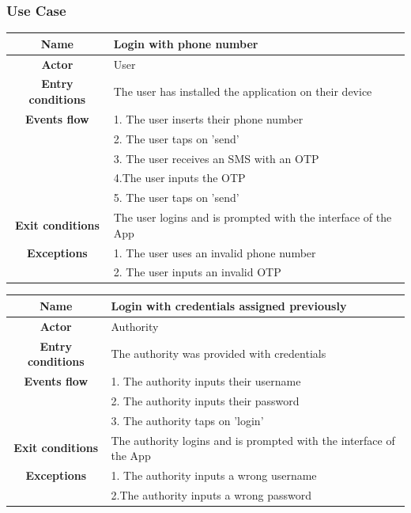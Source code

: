 \subsubsection{Use Case} 

\vspace{1cm}

\begin{flushleft}
\begin{tabular}{|c|l|}
\hline
    \textbf{Name} & Login with phone number\\ \hline
    \textbf{Actor} & User\\ \hline
    \textbf{Entry conditions} & The user has installed the application on their device\\ \hline
    \textbf{Events flow} 
    & 1. The user inserts their phone number\\ 
    & 2. The user taps on 'send'\\ 
    & 3. The user receives an SMS with an OTP\\ 
    & 4.The user inputs the OTP\\ 
    & 5. The user taps on 'send'\\ \hline
    \textbf{Exit conditions} &  The user logins and is prompted with the interface of 
    the App\\ \hline
    \textbf{Exceptions} 
    & 1. The user uses an invalid phone number\\
    & 2. The user inputs an invalid OTP\\ 
\hline 
\end{tabular}
\end{flushleft} 

\vspace{1.5cm}

\begin{flushleft}
\begin{tabular}{|c|l|}
\hline
    \textbf{Name} & Login with credentials assigned previously\\ \hline
    \textbf{Actor} & Authority\\ \hline
    \textbf{Entry conditions} & The authority was provided with credentials\\ \hline
    \textbf{Events flow} 
    & 1. The authority inputs their username\\
    & 2. The authority inputs their password\\
    & 3. The authority taps on 'login'\\ \hline
    \textbf{Exit conditions} & The authority logins and is prompted with the interface of the App\\ \hline
    \textbf{Exceptions} 
    & 1. The authority inputs a wrong username\\
    & 2.The authority inputs a wrong password\\
\hline 
\end{tabular} 
\end{flushleft}


